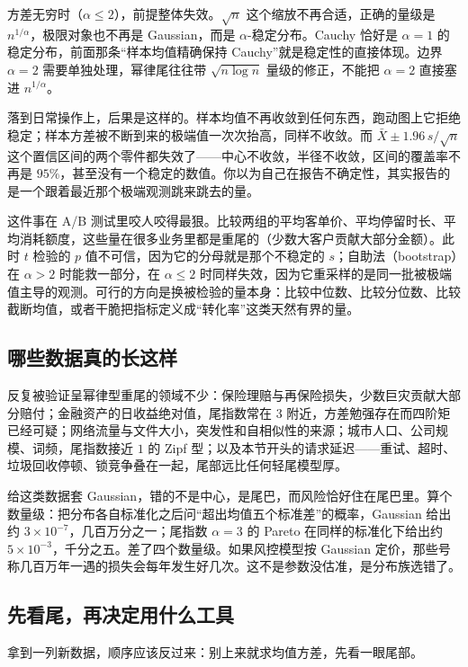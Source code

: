 方差无穷时（\(\alpha\le2\)），前提整体失效。\(\sqrt n\) 这个缩放不再合适，正确的量级是 \(n^{1/\alpha}\)，极限对象也不再是 Gaussian，而是 \(\alpha\)-稳定分布。Cauchy 恰好是 \(\alpha=1\) 的稳定分布，前面那条``样本均值精确保持 Cauchy''就是稳定性的直接体现。边界 \(\alpha=2\) 需要单独处理，幂律尾往往带 \(\sqrt{n\log n}\) 量级的修正，不能把 \(\alpha=2\) 直接塞进 \(n^{1/\alpha}\)。

落到日常操作上，后果是这样的。样本均值不再收敛到任何东西，跑动图上它拒绝稳定；样本方差被不断到来的极端值一次次抬高，同样不收敛。而 \(\bar X\pm 1.96\,s/\sqrt n\) 这个置信区间的两个零件都失效了——中心不收敛，半径不收敛，区间的覆盖率不再是 \(95\%\)，甚至没有一个稳定的数值。你以为自己在报告不确定性，其实报告的是一个跟着最近那个极端观测跳来跳去的量。

这件事在 A/B 测试里咬人咬得最狠。比较两组的平均客单价、平均停留时长、平均消耗额度，这些量在很多业务里都是重尾的（少数大客户贡献大部分金额）。此时 \(t\) 检验的 \(p\) 值不可信，因为它的分母就是那个不稳定的 \(s\)；自助法（bootstrap）在 \(\alpha>2\) 时能救一部分，在 \(\alpha\le2\) 时同样失效，因为它重采样的是同一批被极端值主导的观测。可行的方向是换被检验的量本身：比较中位数、比较分位数、比较截断均值，或者干脆把指标定义成``转化率''这类天然有界的量。

\subsection{哪些数据真的长这样}

反复被验证呈幂律型重尾的领域不少：保险理赔与再保险损失，少数巨灾贡献大部分赔付；金融资产的日收益绝对值，尾指数常在 \(3\) 附近，方差勉强存在而四阶矩已经可疑；网络流量与文件大小，突发性和自相似性的来源；城市人口、公司规模、词频，尾指数接近 \(1\) 的 Zipf 型；以及本节开头的请求延迟——重试、超时、垃圾回收停顿、锁竞争叠在一起，尾部远比任何轻尾模型厚。

给这类数据套 Gaussian，错的不是中心，是尾巴，而风险恰好住在尾巴里。算个数量级：把分布各自标准化之后问``超出均值五个标准差''的概率，Gaussian 给出约 \(3\times10^{-7}\)，几百万分之一；尾指数 \(\alpha=3\) 的 Pareto 在同样的标准化下给出约 \(5\times10^{-3}\)，千分之五。差了四个数量级。如果风控模型按 Gaussian 定价，那些号称几百万年一遇的损失会每年发生好几次。这不是参数没估准，是分布族选错了。

\subsection{先看尾，再决定用什么工具}

拿到一列新数据，顺序应该反过来：别上来就求均值方差，先看一眼尾部。

